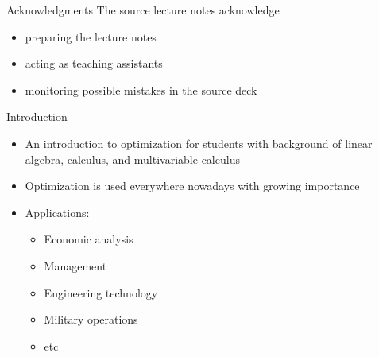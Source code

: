 \documentclass[aspectratio=169,hyperref,UTF8,CJK]{beamer}
\begin{document}
\begin{frame}{Acknowledgments}
  \small
  The source lecture notes acknowledge
  \begin{itemize}
    \item preparing the lecture notes
    \item acting as teaching assistants
    \item monitoring possible mistakes in the source deck
  \end{itemize}
\end{frame}

\begin{frame}{Introduction}
  \begin{itemize}
    \item An introduction to optimization for students with background of linear algebra, calculus, and multivariable calculus
    \item Optimization is used everywhere nowadays with growing importance
    \item Applications:
      \begin{itemize}
        \item Economic analysis
        \item Management
        \item Engineering technology
        \item Military operations
        \item etc
      \end{itemize}
  \end{itemize}
\end{frame}
\end{document}
